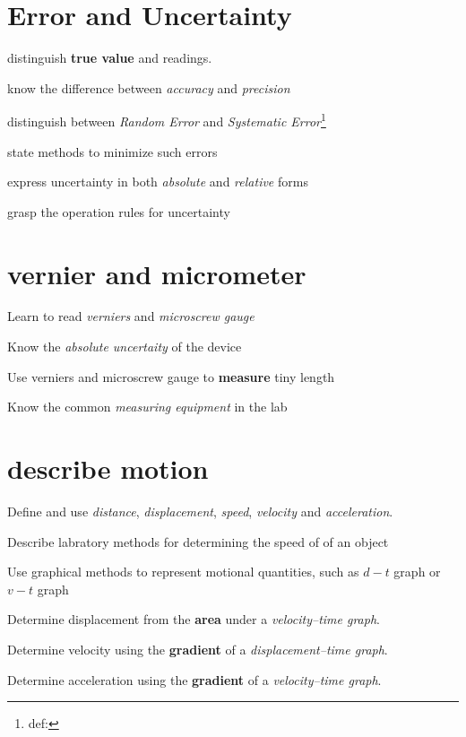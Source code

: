 \documentclass[a4paper]{tufte-handout}
\begin{document}
\section{Error and Uncertainty}
\begin{todolist}
  \item distinguish \textbf{true value} and readings.
  \item know the difference between \emph{accuracy} and \emph{precision}
  \item distinguish between \emph{Random Error} and \emph{Systematic Error}\footnote{def:}
  \item state methods to minimize such errors
  \item express uncertainty in both \emph{absolute} and \emph{relative} forms
  \item grasp the operation rules for uncertainty
\end{todolist}
\clearpage

\section{vernier and micrometer}
\begin{todolist}
	\item Learn to read \emph{verniers} and \emph{microscrew gauge}
	\item Know the \emph{absolute uncertaity} of the device
	\item Use verniers and microscrew gauge to \textbf{measure} tiny length
	\item Know the common \emph{measuring equipment} in the lab
\end{todolist}
\clearpage


\section{describe motion}
\begin{todolist}
  \item Define and use \emph{distance}, \emph{displacement}, \emph{speed}, \emph{velocity} and \emph{acceleration}.
  \item Describe labratory methods for determining the speed of of an object
  \item Use graphical methods to represent motional quantities, such as $d-t$ graph or $v-t$ graph
  \item Determine displacement from the \textbf{area} under a \emph{velocity–time graph}.
  \item Determine velocity using the \textbf{gradient} of a \emph{displacement–time graph}.
  \item Determine acceleration using the \textbf{gradient} of a \emph{velocity–time graph}.
\end{todolist}
\clearpage
\end{document}
